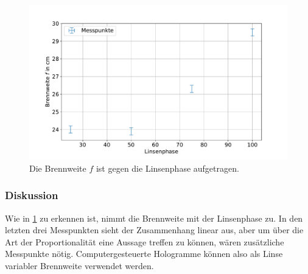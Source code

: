\documentclass[
	a4paper,
	12pt,
	pagesize,
	ngerman
]{scrartcl}
\begin{document}
\begin{figure}[H] %
			\includegraphics[width=0.8\linewidth]{img/fresnel}
			\caption{
				Die Brennweite $f$ ist gegen die Linsenphase aufgetragen.
			}
			\label{fig_fresnel}
	\end{figure}
			\subsubsection*{Diskussion}

		Wie in \cref{fig_fresnel} zu erkennen ist, nimmt die Brennweite mit der Linsenphase zu.
		In den letzten drei Messpunkten sieht der Zusammenhang linear aus, aber um über die Art der Proportionalität eine Aussage treffen zu können, wären zusätzliche Messpunkte nötig.
		Computergesteuerte Hologramme können also als Linse variabler Brennweite verwendet werden.
\end{document}
